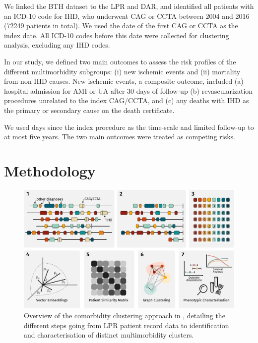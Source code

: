 We linked the \ac{BTH} dataset to the \ac{LPR} and \ac{DAR}, 
and identified all patients with an \ac{ICD-10} code for \ac{IHD},
who underwent \ac{CAG} or \ac{CCTA} between 2004 and 2016 
(\num{72249} patients in total).
We used the date of the first \ac{CAG} or \ac{CCTA} as the index date. 
All \ac{ICD-10} codes before this date were collected
for clustering analysis, excluding any \ac{IHD} codes.

In our study, we defined two main outcomes to assess the risk
profiles of the different multimorbidity subgroups: (i) new ischemic events
and (ii) mortality from non-\ac{IHD} causes.
New ischemic events, a composite outcome, included 
(a) hospital admission for \ac{AMI} or \ac{UA} after 30 days of follow-up
(b) revascularization procedures unrelated to the index \ac{CAG}/\ac{CCTA},
and (c) any deaths with \ac{IHD} as the primary or secondary
cause on the death certificate.

We used days since the index procedure as the time-scale and limited 
follow-up to at most five years. The two main outcomes were treated
as competing risks.

\section{Methodology}

\begin{figure}[tp]
    \includegraphics{graphics/clustering-overview.pdf}
    \caption[Overview of Study I Methodology]{%
        Overview of the comorbidity clustering approach in \studyi{},
        detailing the different steps going from \ac{LPR} patient record data
        to identification and characterisation of distinct 
        multimorbidity clusters. 
    }
    \label{fig:dishisclust}
\end{figure}

